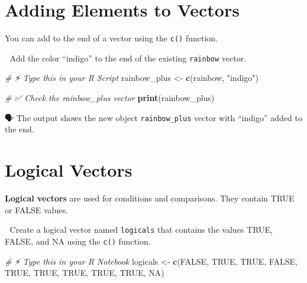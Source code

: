 \documentclass[
  12pt,
]{scrreprt}
\newenvironment{Shaded}{\begin{snugshade}}{\end{snugshade}}
\newcommand{\CommentTok}[1]{\textcolor[rgb]{0.56,0.35,0.01}{\textit{#1}}}
\newcommand{\ConstantTok}[1]{\textcolor[rgb]{0.56,0.35,0.01}{#1}}
\newcommand{\FunctionTok}[1]{\textcolor[rgb]{0.13,0.29,0.53}{\textbf{#1}}}
\newcommand{\NormalTok}[1]{#1}
\newcommand{\OtherTok}[1]{\textcolor[rgb]{0.56,0.35,0.01}{#1}}
\newcommand{\StringTok}[1]{\textcolor[rgb]{0.31,0.60,0.02}{#1}}
\begin{document}
\section{Adding Elements to Vectors}\label{adding-elements-to-vectors}

You can add to the end of a vector using the \texttt{c()} function.

🎯 Add the color ``indigo'' to the end of the existing \texttt{rainbow}
vector.

\begin{Shaded}
\begin{Highlighting}[]
\CommentTok{\# ⚡ Type this in your R Script}
\NormalTok{rainbow\_plus }\OtherTok{\textless{}{-}} \FunctionTok{c}\NormalTok{(rainbow, }\StringTok{"indigo"}\NormalTok{)}
\end{Highlighting}
\end{Shaded}

\begin{Shaded}
\begin{Highlighting}[]
\CommentTok{\# ✅ Check the rainbow\_plus vector}
\FunctionTok{print}\NormalTok{(rainbow\_plus)}
\end{Highlighting}
\end{Shaded}

🗣 The output shows the new object \texttt{rainbow\_plus} vector with
``indigo'' added to the end.

\section{Logical Vectors}\label{logical-vectors}

\textbf{Logical vectors} are used for conditions and comparisons. They
contain TRUE or FALSE values.

🎯 Create a logical vector named \texttt{logicals} that contains the
values TRUE, FALSE, and NA using the \texttt{c()} function.

\begin{Shaded}
\begin{Highlighting}[]
\CommentTok{\# ⚡ Type this in your R Notebook}
\NormalTok{logicals }\OtherTok{\textless{}{-}} \FunctionTok{c}\NormalTok{(}\ConstantTok{FALSE}\NormalTok{, }\ConstantTok{TRUE}\NormalTok{, }\ConstantTok{TRUE}\NormalTok{, }\ConstantTok{FALSE}\NormalTok{, }\ConstantTok{TRUE}\NormalTok{, }\ConstantTok{TRUE}\NormalTok{, }\ConstantTok{TRUE}\NormalTok{, }\ConstantTok{TRUE}\NormalTok{, }\ConstantTok{TRUE}\NormalTok{, }\ConstantTok{NA}\NormalTok{)}
\end{Highlighting}
\end{Shaded}
\end{document}
